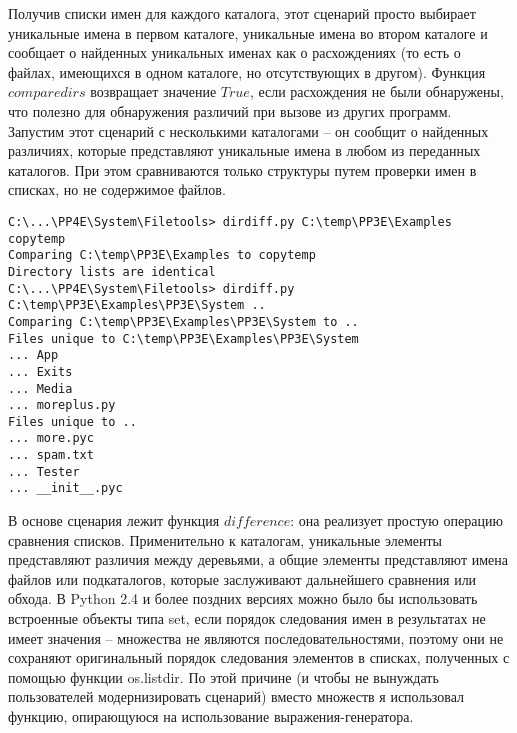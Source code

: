 \documentclass[12pt]{article}
\begin{document}
Получив списки имен для каждого каталога, этот сценарий просто
выбирает уникальные имена в первом каталоге, уникальные имена
во втором каталоге и сообщает о найденных уникальных именах как
о расхождениях (то есть о файлах, имеющихся в одном каталоге, но отсутствующих в другом). Функция $comparedirs$ возвращает значение $True$,
если расхождения не были обнаружены, что полезно для обнаружения
различий при вызове из других программ. \\
Запустим этот сценарий с несколькими каталогами – он сообщит о найденных различиях, которые представляют уникальные имена в любом
из переданных каталогов. При этом сравниваются только структуры путем проверки имен в списках, но не содержимое файлов.
\begin{verbatim}
C:\...\PP4E\System\Filetools> dirdiff.py C:\temp\PP3E\Examples copytemp
Comparing C:\temp\PP3E\Examples to copytemp
Directory lists are identical
C:\...\PP4E\System\Filetools> dirdiff.py C:\temp\PP3E\Examples\PP3E\System ..
Comparing C:\temp\PP3E\Examples\PP3E\System to ..
Files unique to C:\temp\PP3E\Examples\PP3E\System
... App
... Exits
... Media
... moreplus.py
Files unique to ..
... more.pyc
... spam.txt
... Tester
... __init__.pyc
\end{verbatim}
В основе сценария лежит функция $difference$: она реализует простую
операцию сравнения списков. Применительно к каталогам, уникальные
элементы представляют различия между деревьями, а общие элементы
представляют имена файлов или подкаталогов, которые заслуживают
дальнейшего сравнения или обхода. В Python 2.4 и более поздних версиях можно было бы использовать встроенные объекты типа set, если
порядок следования имен в результатах не имеет значения – множества
не являются последовательностями, поэтому они не сохраняют оригинальный порядок следования элементов в списках, полученных с помощью функции os.listdir. По этой причине (и чтобы не вынуждать
пользователей модернизировать сценарий) вместо множеств я использовал функцию, опирающуюся на использование выражения-генератора.
\end{document}
